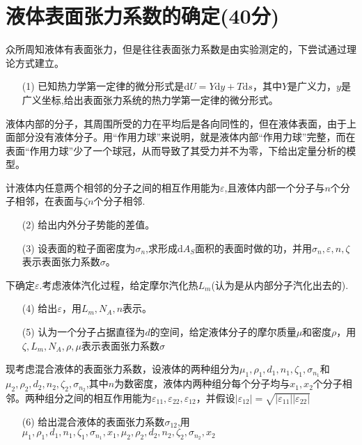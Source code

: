 \documentclass{article}
\begin{document}
\section*{液体表面张力系数的确定(40分)}
众所周知液体有表面张力，但是往往表面张力系数是由实验测定的，下尝试通过理论方式建立。\par
\begin{itemize}
\item[(1)]已知热力学第一定律的微分形式是$\mathrm{d}U=Y\mathrm{d}y+T\mathrm{d}s$，其中$Y$是广义力，$y$是广义坐标,给出表面张力系统的热力学第一定律的微分形式。
\end{itemize}\par
液体内部的分子，其周围所受的力在平均后是各向同性的，但在液体表面，由于上面部分没有液体分子。用“作用力球”来说明，就是液体内部“作用力球”完整，而在表面“作用力球”少了一个球冠，从而导致了其受力并不为零，下给出定量分析的模型。\par
计液体内任意两个相邻的分子之间的相互作用能为$\varepsilon$,且液体内部一个分子与$n$个分子相邻，在表面与$\zeta n$个分子相邻.
\begin{itemize}
\item[(2)]给出内外分子势能的差值。
\item[(3)]设表面的粒子面密度为$\sigma_n$,求形成$\mathrm{d}A_S$面积的表面时做的功，并用$\sigma_n,\varepsilon,n,\zeta$表示表面张力系数$\sigma$。\par
\end{itemize}
\par
下确定$\varepsilon$.考虑液体汽化过程，给定摩尔汽化热$L_m$(认为是从内部分子汽化出去的).
\begin{itemize}
\item[(4)]给出$\varepsilon$，用$L_m,N_A,n$表示。
\item[(5)]认为一个分子占据直径为$d$的空间，给定液体分子的摩尔质量$\mu$和密度$\rho$，用$\zeta,L_m,N_A,\rho,\mu$表示表面张力系数$\sigma$ 
\end{itemize}
\par
现考虑混合液体的表面张力系数，设液体的两种组分为$\mu_1,\rho_1,d_1,n_1,\zeta_1,\sigma_{n_1}$和$\mu_2,\rho_2,d_2,n_2,\zeta_2,\sigma_{n_2}$,其中$n$为数密度，液体内两种组分每个分子均与$x_1,x_2$个分子相邻。两种组分之间的相互作用能为$\varepsilon_{11},\varepsilon_{22},\varepsilon_{12}$，并假设$|\varepsilon_{12}|=\sqrt{|\varepsilon_{11}||\varepsilon_{22}|}$
\begin{itemize}
\item[(6)]给出混合液体的表面张力系数$\sigma_{12}$,用$\mu_1,\rho_1,d_1,n_1,\zeta_1,\sigma_{n_1},x_1,\mu_2,\rho_2,d_2,n_2,\zeta_2,\sigma_{n_2},x_2$
\end{itemize}
\end{document}
